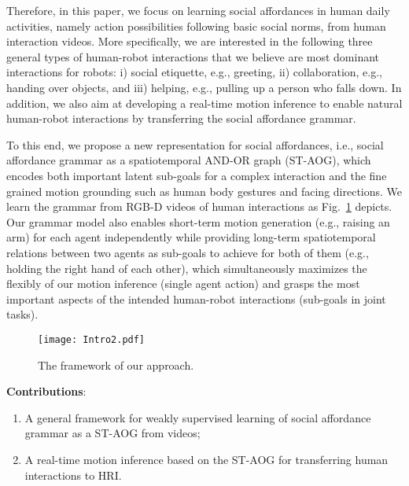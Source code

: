 \documentclass[letterpaper, 10 pt, conference]{ieeeconf}  %
\begin{document}
Therefore, in this paper, we focus on learning social affordances in human daily activities, namely action possibilities following basic social norms, from human interaction videos. More specifically, we are interested in the following three general types of human-robot interactions that we believe are most dominant interactions for robots: i) social etiquette, e.g., greeting, ii) collaboration, e.g., handing over objects, and iii) helping, e.g., pulling up a person who falls down. In addition, we also aim at developing a real-time motion inference to enable natural human-robot interactions by transferring the social affordance grammar. %

To this end, we propose a new representation for social affordances, i.e., social affordance grammar as a spatiotemporal AND-OR graph (ST-AOG), which encodes both important latent sub-goals for a complex interaction and the fine grained motion grounding such as human body gestures and facing directions. We learn the grammar from RGB-D videos of human interactions as Fig.~\ref{fig:intro} depicts. Our grammar model also enables short-term motion generation (e.g., raising an arm) for each agent independently while providing long-term spatiotemporal relations between two agents as sub-goals to achieve for both of them (e.g., holding the right hand of each other), which simultaneously maximizes the flexibly of our motion inference (single agent action) and grasps the most important aspects of the intended human-robot interactions (sub-goals in joint tasks).



\begin{figure}[t!]
    \centering
    \texttt{[image: Intro2.pdf]}
    \vspace{-5pt}
    \caption{The framework of our approach.}
    \vspace{-10pt}
    \label{fig:intro}
\end{figure}


\textbf{Contributions}:
\vspace{-3pt}
\begin{enumerate}%
    \item A general framework for weakly supervised learning of social affordance grammar as a ST-AOG from videos;
    \item A real-time motion inference based on the ST-AOG for transferring human interactions to HRI.%
\end{enumerate}
\end{document}
